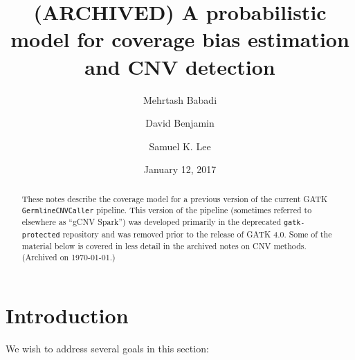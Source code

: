 \documentclass[nofootinbib,amssymb,amsmath]{revtex4}
\begin{document}
\title{(ARCHIVED) A probabilistic model for coverage bias estimation and CNV detection}

\author{Mehrtash Babadi}

\author{David Benjamin}

\author{Samuel K. Lee}

\date{January 12, 2017}

\begin{abstract}
These notes describe the coverage model for a previous version of the current GATK \texttt{GermlineCNVCaller} pipeline.  This version of the pipeline (sometimes referred to elsewhere as ``gCNV Spark'') was developed primarily in the deprecated \texttt{gatk-protected} repository and was removed prior to the release of GATK 4.0.  Some of the material below is covered in less detail in the archived notes on CNV methods.  (Archived on \today.)
\end{abstract}

\maketitle

\section{Introduction}
\noindent We wish to address several goals in this section:
\end{document}
